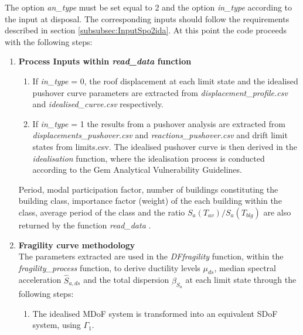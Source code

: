 The option \textit{an\_type} must be set equal to 2 and the option \textit{in\_type} according to the input at disposal. The corresponding inputs should follow the requirements described in section \ref{subsubsec:InputSpo2ida}. At this point the code proceeds with the following steps:\\

\begin{enumerate}
\item \textbf{Process Inputs within \textit{read\_data}  function}\\

\begin{enumerate}
\item If \textit{in\_type} = 0, the roof displacement at each limit state and the idealised pushover curve parameters are extracted from \textit{displacement\_profile.csv} and \textit{idealised\_curve.csv} respectively.
\item If \textit{in\_type} = 1 the results from a pushover analysis are extracted from \textit{displacements\_pushover.csv} and \textit{reactions\_pushover.csv} and drift limit states from {limits.csv}. The idealised pushover curve is then derived in the \textit{idealisation} function, where the idealisation process is conducted according to the Gem Analytical Vulnerability Guidelines.\\
\end{enumerate}

Period, modal participation factor, number of buildings constituting the building class, importance factor (weight) of the each building within the class, average period of the class and the ratio $S_a(T_{av})/S_a(T_{blg})$ are also returned by the function \textit{read\_data} .\\

\item \textbf{Fragility curve methodology}\\
The parameters extracted are used in the \textit{DF\-fragility} function, within the \textit{fragility\_process} function, to derive ductility levels $\mu_{ds}$, median spectral acceleration $\hat{S}_{a,ds}$ and the total dispersion $\beta_{S_a}$ at each limit state through the following steps:

\begin{enumerate}

\item The idealised MDoF system is transformed into an equivalent SDoF system, using $\Gamma_1$.


\end{enumerate}
\end{enumerate}
